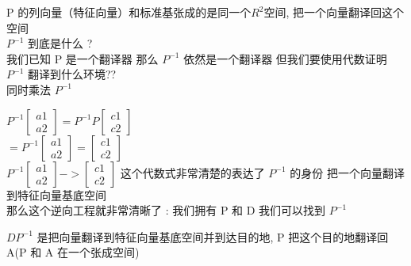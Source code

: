 \documentclass[12pt]{article}
\begin{document}
\begin{flushleft}
    P 的列向量（特征向量）和标准基张成的是同一个$R^{2}$空间, 把一个向量翻译回这个空间 \\


    $P^{-1}$ 到底是什么 ? \\
    我们已知 P 是一个翻译器  那么 $P^{-1}$ 依然是一个翻译器 但我们要使用代数证明 $P^{-1}$ 翻译到什么环境?? \\
    同时乘法 $P^{-1}$

    $P^{-1}\begin{bmatrix}
            a1 \\
            a2
        \end{bmatrix} =P^{-1} P \begin{bmatrix}
            c1 \\
            c2
        \end{bmatrix}$ \\
    $= P^{-1}\begin{bmatrix}
            a1 \\
            a2
        \end{bmatrix} =  \begin{bmatrix}
            c1 \\
            c2
        \end{bmatrix} $ \\
    $ P^{-1}\begin{bmatrix}
            a1 \\
            a2
        \end{bmatrix} -> \begin{bmatrix}
            c1 \\
            c2
        \end{bmatrix}$  这个代数式非常清楚的表达了 $P^{-1}$ 的身份 把一个向量翻译到特征向量基底空间  \\


    那么这个逆向工程就非常清晰了 : 我们拥有 P 和 D 我们可以找到 $P^{-1}$

    $DP^{-1}$ 是把向量翻译到特征向量基底空间并到达目的地,   P 把这个目的地翻译回 A(P 和 A 在一个张成空间)

\end{flushleft}
\end{document}
